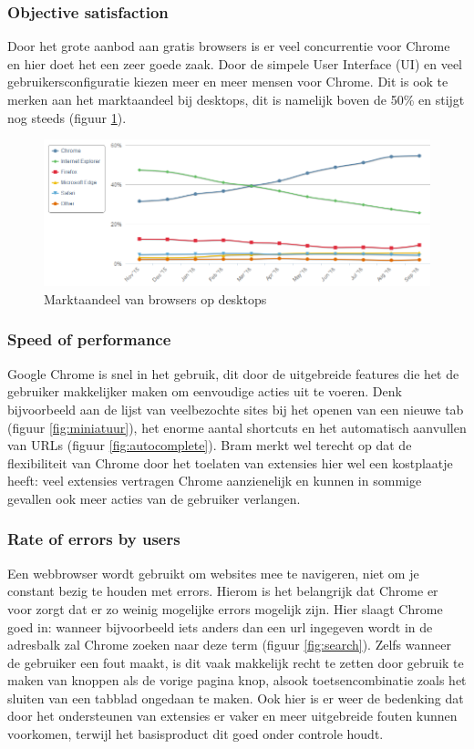 \documentclass[12pt]{article}
\begin{document}
\subsubsection{Objective satisfaction}
Door het grote aanbod aan gratis browsers is er veel concurrentie voor Chrome en hier doet het een zeer goede zaak. Door de simpele User Interface (UI) en veel gebruikersconfiguratie kiezen meer en meer mensen voor Chrome. Dit is ook te merken aan het marktaandeel bij desktops, dit is namelijk boven de 50\% en stijgt nog steeds (figuur \ref{fig:marktaandeel}). 
\begin{figure}
	\centering
	\includegraphics[width=1.1\textwidth]{marketshare.png}
	\caption{Marktaandeel van browsers op desktops\cite{NetShare}}
	\label{fig:marktaandeel}
\end{figure}
\newpage
\subsubsection{Speed of performance}
Google Chrome is snel in het gebruik, dit door de uitgebreide features die het de gebruiker makkelijker maken om eenvoudige acties uit te voeren. Denk bijvoorbeeld aan de lijst van veelbezochte sites bij het openen van een nieuwe tab (figuur \ref{fig:miniatuur}), het enorme aantal shortcuts\cite{shortcuts} en het automatisch aanvullen van URLs (figuur \ref{fig:autocomplete}). Bram merkt wel terecht op dat de flexibiliteit van Chrome door het toelaten van extensies hier wel een kostplaatje heeft: veel extensies vertragen Chrome aanzienelijk\cite{slow} en kunnen in sommige gevallen ook meer acties van de gebruiker verlangen.
\subsubsection{Rate of errors by users}
Een webbrowser wordt gebruikt om websites mee te navigeren, niet om je constant bezig te houden met errors. Hierom is het belangrijk dat Chrome er voor zorgt dat er zo weinig mogelijke errors mogelijk zijn. Hier slaagt Chrome goed in: wanneer bijvoorbeeld iets anders dan een url ingegeven wordt in de adresbalk zal Chrome zoeken naar deze term (figuur \ref{fig:search}). Zelfs wanneer de gebruiker een fout maakt, is dit vaak makkelijk recht te zetten door gebruik te maken van knoppen als de vorige pagina knop, alsook toetsencombinatie zoals het sluiten van een tabblad ongedaan te maken. Ook hier is er weer de bedenking dat door het ondersteunen van extensies er vaker en meer uitgebreide fouten kunnen voorkomen, terwijl het basisproduct dit goed onder controle houdt.
\end{document}
